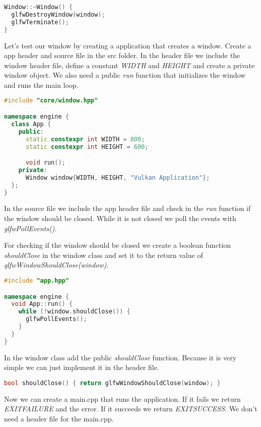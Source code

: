 \documentclass[12pt]{report} \usepackage{preamble}
\begin{document}
\begin{lstlisting}[language=C++]
Window::~Window() {
  glfwDestroyWindow(window);
  glfwTerminate();
}
\end{lstlisting}

Let's test our window by creating a application that creates a window.
Create a app header and source file in the src folder. In the header file we include the window header file,
define a constant \textit{WIDTH} and \textit{HEIGHT} and create a private window object.
We also need a public \textit{run} function that initializes the window and runs the main loop.

\newpage

\begin{lstlisting}[language=C++]
#include "core/window.hpp"

namespace engine {
  class App {
    public:
      static constexpr int WIDTH = 800;
      static constexpr int HEIGHT = 600;

      void run();
    private:
      Window window{WIDTH, HEIGHT, "Vulkan Application"};
  };
}
\end{lstlisting}

In the source file we include the app header file and check in the \textit{run} function if the window
should be closed. While it is not closed we poll the events with \textit{glfwPollEvents()}.

For checking if the window should be closed we create a boolean function \textit{shouldClose} in the
window class and set it to the return value of \textit{glfwWindowShouldClose(window)}.

\begin{lstlisting}[language=C++]
#include "app.hpp"

namespace engine {
  void App::run() {
    while (!window.shouldClose()) {
      glfwPollEvents();
    }
  }
} 
\end{lstlisting}

In the window class add the public \textit{shouldClose} function.
Because it is very simple we can just implement it in the header file.

\begin{lstlisting}[language=C++]
bool shouldClose() { return glfwWindowShouldClose(window); }
\end{lstlisting}

Now we can create a main.cpp that runs the application.
If it fails we return \textit{EXIT\textunderscore FAILURE} and the error.
If it succeeds we return \textit{EXIT\textunderscore SUCCESS}.
We don't need a header file for the main.cpp.
\end{document}
